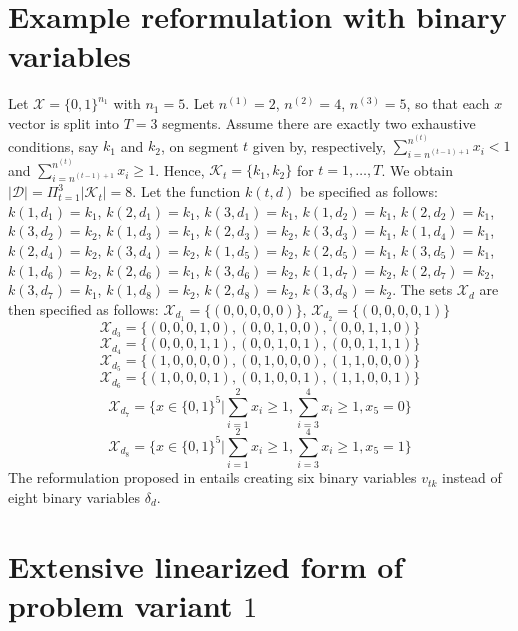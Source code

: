 \documentclass[12pt]{article}
\theoremstyle{thmstylethree}%
\newcommand{\mtc}[1] {\mathcal{#1}}
\begin{document}
\begin{appendices}
\section{Example reformulation with binary variables}\label{sec:app:example}

Let $\mtc{X}=\{0,1\}^{n_1}$ with $n_1=5$.
Let $n^{(1)}=2$, $n^{(2)}=4$, $n^{(3)}=5$, so that each $x$ vector is split into $T=3$ segments.
Assume there are exactly two exhaustive conditions, say $k_1$ and $k_2$, on segment $t$ given by, respectively, 
$\sum_{i=n^{(t-1)+1}}^{n^{(t)}}x_i<1$ and $\sum_{i=n^{(t-1)+1}}^{n^{(t)}}x_i\geq 1$.
Hence, $\mtc{K}_t=\{k_1,k_2\}$ for $t=1,\ldots,T$.
We obtain $\lvert\mtc{D}\rvert=\Pi_{t=1}^3\lvert\mtc{K}_t\rvert=8$.
Let the function $k(t,d)$ be specified as follows: 
$k(1,d_1)=k_1$, $k(2,d_1)=k_1$, $k(3,d_1)=k_1$,
$k(1,d_2)=k_1$, $k(2,d_2)=k_1$, $k(3,d_2)=k_2$,
$k(1,d_3)=k_1$, $k(2,d_3)=k_2$, $k(3,d_3)=k_1$,
$k(1,d_4)=k_1$, $k(2,d_4)=k_2$, $k(3,d_4)=k_2$,
$k(1,d_5)=k_2$, $k(2,d_5)=k_1$, $k(3,d_5)=k_1$,
$k(1,d_6)=k_2$, $k(2,d_6)=k_1$, $k(3,d_6)=k_2$,
$k(1,d_7)=k_2$, $k(2,d_7)=k_2$, $k(3,d_7)=k_1$,
$k(1,d_8)=k_2$, $k(2,d_8)=k_2$, $k(3,d_8)=k_2$.
The sets $\mtc{X}_d$ are then specified as follows:
$\mtc{X}_{d_1}=\{(0,0,0,0,0)\}$, $\mtc{X}_{d_2}=\{(0,0,0,0,1)\}$
$$\mtc{X}_{d_3}=\{(0,0,0,1,0),(0,0,1,0,0),(0,0,1,1,0)\}$$
$$\mtc{X}_{d_4}=\{(0,0,0,1,1),(0,0,1,0,1),(0,0,1,1,1)\}$$
$$\mtc{X}_{d_5}=\{(1,0,0,0,0),(0,1,0,0,0),(1,1,0,0,0)\}$$
$$\mtc{X}_{d_6}=\{(1,0,0,0,1),(0,1,0,0,1),(1,1,0,0,1)\}$$
$$\mtc{X}_{d_7}=\{x\in\{0,1\}^5\vert \sum_{i=1}^{2}x_i\geq 1, \sum_{i=3}^{4}x_i\geq 1, x_5 = 0\}$$
$$\mtc{X}_{d_8}=\{x\in\{0,1\}^5\vert \sum_{i=1}^{2}x_i\geq 1, \sum_{i=3}^{4}x_i\geq 1, x_5 = 1\}$$
The reformulation proposed in  entails creating six binary variables $v_{tk}$ instead of eight binary variables $\delta_d$.




\section{Extensive linearized form of problem variant $1$}\label{app:lin}


\end{appendices}
\end{document}
